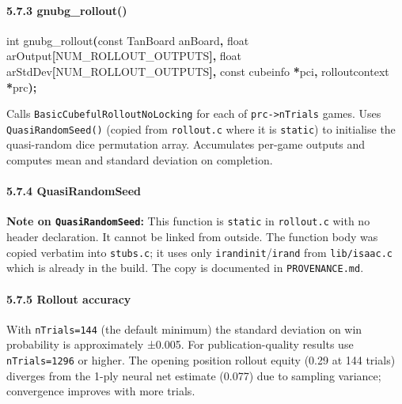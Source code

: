 \documentclass[11pt,a4paper]{article}
\newenvironment{Shaded}{%
  \setlength{\FrameSep}{4pt}%
  \definecolor{shadecolor}{RGB}{245,245,245}%
  \begin{snugshade}\footnotesize
}{\end{snugshade}}
\newcommand{\DataTypeTok}[1]{\textcolor[rgb]{0.13,0.29,0.53}{#1}}
\newcommand{\NormalTok}[1]{#1}
\newcommand{\OperatorTok}[1]{\textcolor[rgb]{0.81,0.36,0.00}{\textbf{#1}}}
\begin{document}
\paragraph{5.7.3 gnubg\_rollout()}\label{gnubg_rollout}

\begin{Shaded}
\begin{Highlighting}[]
\DataTypeTok{int}\NormalTok{ gnubg\_rollout}\OperatorTok{(}\DataTypeTok{const}\NormalTok{ TanBoard anBoard}\OperatorTok{,}
                  \DataTypeTok{float}\NormalTok{ arOutput}\OperatorTok{[}\NormalTok{NUM\_ROLLOUT\_OUTPUTS}\OperatorTok{],}
                  \DataTypeTok{float}\NormalTok{ arStdDev}\OperatorTok{[}\NormalTok{NUM\_ROLLOUT\_OUTPUTS}\OperatorTok{],}
                  \DataTypeTok{const}\NormalTok{ cubeinfo }\OperatorTok{*}\NormalTok{pci}\OperatorTok{,}\NormalTok{ rolloutcontext }\OperatorTok{*}\NormalTok{prc}\OperatorTok{);}
\end{Highlighting}
\end{Shaded}

Calls \texttt{BasicCubefulRolloutNoLocking} for each of
\texttt{prc-\textgreater{}nTrials} games. Uses
\texttt{QuasiRandomSeed()} (copied from \texttt{rollout.c} where it is
\texttt{static}) to initialise the quasi-random dice permutation array.
Accumulates per-game outputs and computes mean and standard deviation on
completion.

\paragraph{5.7.4 QuasiRandomSeed}\label{quasirandomseed}

\textbf{Note on \texttt{QuasiRandomSeed}:} This function is
\texttt{static} in \texttt{rollout.c} with no header declaration. It
cannot be linked from outside. The function body was copied verbatim
into \texttt{stubs.c}; it uses only \texttt{irandinit}/\texttt{irand}
from \texttt{lib/isaac.c} which is already in the build. The copy is
documented in \texttt{PROVENANCE.md}.

\paragraph{5.7.5 Rollout accuracy}\label{rollout-accuracy}

With \texttt{nTrials=144} (the default minimum) the standard deviation
on win probability is approximately ±0.005. For publication-quality
results use \texttt{nTrials=1296} or higher. The opening position
rollout equity (0.29 at 144 trials) diverges from the 1-ply neural net
estimate (0.077) due to sampling variance; convergence improves with
more trials.
\end{document}
